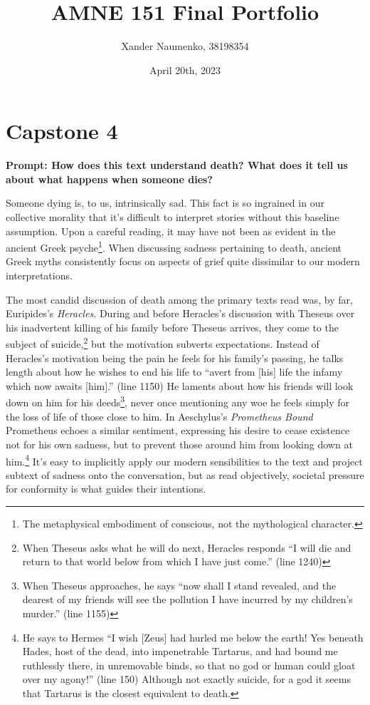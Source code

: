 \documentclass[letterpaper, reqno,11pt]{article}
\begin{document}
\title{AMNE 151 Final Portfolio}
\date{April 20th, 2023}
\author{Xander Naumenko, 38198354}
\maketitle

\section*{Capstone 4}

{\noindent\bf Prompt: How does this text understand death? What does it tell us about what happens when someone dies?}

\medskip

Someone dying is, to us, intrinsically sad. This fact is so ingrained in our collective morality that it's difficult to interpret stories without this baseline assumption. Upon a careful reading, it may have not been as evident in the ancient Greek psyche\footnote{The metaphysical embodiment of conscious, not the mythological character.}. When discussing sadness pertaining to death, ancient Greek myths consistently focus on aspects of grief quite dissimilar to our modern interpretations.

\medskip

The most candid discussion of death among the primary texts read was, by far, Euripides's {\em Heracles}. During and before Heracles's discussion with Theseus over his inadvertent killing of his family before Theseus arrives, they come to the subject of suicide,\footnote{When Theseus asks what he will do next, Heracles responds ``I will die and return to
that world below from which I have just come.'' \parencite{Euripides} (line 1240)} but the motivation subverts expectations. Instead of Heracles's motivation being the pain he feels for his family's passing, he talks length about how he wishes to end his life to ``avert from [his] life the infamy which now awaits [him].'' \autocite{Euripides} (line 1150) He laments about how his friends will look down on him for his deeds\footnote{When Theseus approaches, he says ``now shall I stand revealed, and the dearest of my friends will see the pollution I have incurred by my children’s murder.''\parencite{Euripides} (line 1155)}, never once mentioning any woe he feels simply for the loss of life of those close to him. In Aeschylus's {\em Prometheus Bound}\autocite{bound} Prometheus echoes a similar sentiment, expressing his desire to cease existence not for his own sadness, but to prevent those around him from looking down at him.\footnote{He says to Hermes ``I wish [Zeus] had hurled me below the earth! Yes beneath Hades, host of the dead, into impenetrable Tartarus, and had bound me ruthlessly there, in unremovable binds, so that no god or human could gloat over my agony!'' \parencite{bound} (line 150) Although not exactly suicide, for a god it seems that Tartarus is the closest equivalent to death.} It's easy to implicitly apply our modern sensibilities to the text and project subtext of sadness onto the conversation, but as read objectively, societal pressure for conformity is what guides their intentions.
\end{document}
